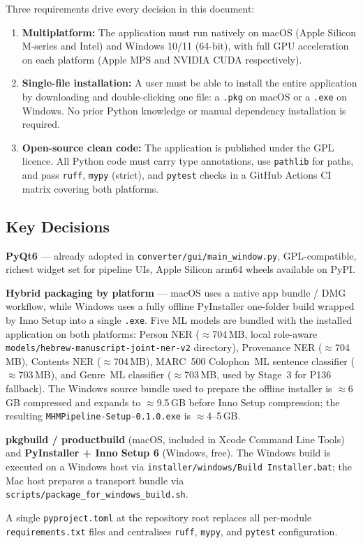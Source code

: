 \documentclass[12pt]{article}
\newcommand{\filepath}[1]{\texttt{\small #1}}
\newcommand{\code}[1]{\texttt{#1}}
\begin{document}
Three requirements drive every decision in this document:

\begin{enumerate}
\item \textbf{Multiplatform:} The application must run natively on macOS (Apple Silicon M-series and Intel) and Windows 10/11 (64-bit), with full GPU acceleration on each platform (Apple MPS and NVIDIA CUDA respectively).
\item \textbf{Single-file installation:} A user must be able to install the entire application by downloading and double-clicking one file: a \code{.pkg} on macOS or a \code{.exe} on Windows. No prior Python knowledge or manual dependency installation is required.
\item \textbf{Open-source clean code:} The application is published under the GPL licence. All Python code must carry type annotations, use \code{pathlib} for paths, and pass \code{ruff}, \code{mypy} (strict), and \code{pytest} checks in a GitHub Actions CI matrix covering both platforms.
\end{enumerate}

\subsection{Key Decisions}

\begin{description}[style=nextline, leftmargin=3cm]
\item[GUI framework] \textbf{PyQt6} --- already adopted in \filepath{converter/gui/main\_window.py}, GPL-compatible, richest widget set for pipeline UIs, Apple Silicon arm64 wheels available on PyPI.
\item[Distribution] \textbf{Hybrid packaging by platform} --- macOS uses a native app bundle / DMG workflow, while Windows uses a fully offline PyInstaller one-folder build wrapped by Inno Setup into a single \code{.exe}. Five ML models are bundled with the installed application on both platforms: Person NER ($\approx$704\,MB, local role-aware \code{models/hebrew-manuscript-joint-ner-v2} directory), Provenance NER ($\approx$704\,MB), Contents NER ($\approx$704\,MB), MARC~500 Colophon~ML sentence classifier ($\approx$703\,MB), and Genre~ML classifier ($\approx$703\,MB, used by Stage~3 for P136 fallback). The Windows source bundle used to prepare the offline installer is $\approx$6\,GB compressed and expands to $\approx$9.5\,GB before Inno Setup compression; the resulting \code{MHMPipeline-Setup-0.1.0.exe} is $\approx$4--5\,GB.
\item[Build toolchain] \textbf{pkgbuild / productbuild} (macOS, included in Xcode Command Line Tools) and \textbf{PyInstaller + Inno Setup 6} (Windows, free). The Windows build is executed on a Windows host via \filepath{installer/windows/Build Installer.bat}; the Mac host prepares a transport bundle via \filepath{scripts/package\_for\_windows\_build.sh}.
\item[Project config] A single \code{pyproject.toml} at the repository root replaces all per-module \code{requirements.txt} files and centralises \code{ruff}, \code{mypy}, and \code{pytest} configuration.
\end{description}
\end{document}
